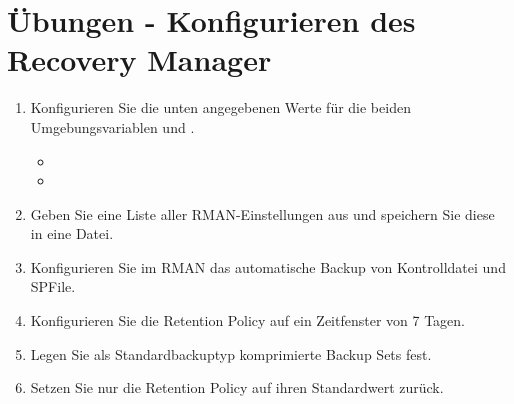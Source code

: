 \section{Übungen - Konfigurieren des Recovery Manager}
  \begin{enumerate}
    \item Konfigurieren Sie die unten angegebenen Werte für die beiden Umgebungsvariablen  und .
      \begin{itemize}
        \item {}
        \item {}
      \end{itemize}
    \item Geben Sie eine Liste aller RMAN-Einstellungen aus und speichern Sie diese in eine Datei.
    \item Konfigurieren Sie im RMAN das automatische Backup von Kontrolldatei und SPFile.
    \item Konfigurieren Sie die Retention Policy auf ein Zeitfenster von 7 Tagen.
    \item Legen Sie als Standardbackuptyp komprimierte Backup Sets fest.
    \item Setzen Sie nur die Retention Policy auf ihren Standardwert zurück.
  \end{enumerate}
\clearpage